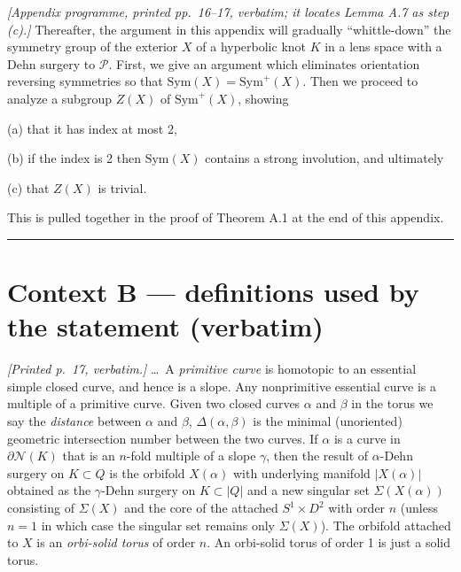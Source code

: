 \documentclass[11pt]{article}
\newcommand{\Sym}{\ensuremath{\mathrm{Sym}}}
\newcommand{\Ps}{\ensuremath{\mathcal{P}}}   %
\newcommand{\Ns}{\ensuremath{\mathcal{N}}}   %
\begin{document}
\medskip
\noindent\textit{[Appendix programme, printed pp.~16--17, verbatim; it locates Lemma A.7 as step
(c).]} Thereafter, the argument in this appendix will gradually ``whittle-down'' the symmetry group
of the exterior $X$ of a hyperbolic knot $K$ in a lens space with a Dehn surgery to $\Ps$. First,
we give an argument which eliminates orientation reversing symmetries so that
$\Sym(X) = \Sym^+(X)$. Then we proceed to analyze a subgroup $Z(X)$ of $\Sym^+(X)$, showing

(a) that it has index at most 2,

(b) if the index is 2 then $\Sym(X)$ contains a strong involution, and ultimately

(c) that $Z(X)$ is trivial.

This is pulled together in the proof of Theorem A.1 at the end of this appendix.

\bigskip
\hrule
\bigskip

\section*{Context B --- definitions used by the statement (verbatim)}


\noindent\textit{[Printed p.~17, verbatim.]} \dots\ A \emph{primitive curve}
is homotopic to an essential simple closed curve, and hence is a slope. Any nonprimitive essential
curve is a multiple of a primitive curve. Given two closed curves $\alpha$ and $\beta$ in the torus
we say the \emph{distance} between $\alpha$ and $\beta$, $\Delta(\alpha,\beta)$ is the minimal
(unoriented) geometric intersection number between the two curves. If $\alpha$ is a curve in
$\partial\Ns(K)$ that is an $n$-fold multiple of a slope $\gamma$, then the result of $\alpha$-Dehn
surgery on $K \subset Q$ is the orbifold $X(\alpha)$ with underlying manifold $|X(\alpha)|$
obtained as the $\gamma$-Dehn surgery on $K \subset |Q|$ and a new singular set $\Sigma(X(\alpha))$
consisting of $\Sigma(X)$ and the core of the attached $S^1\times D^2$ with order $n$ (unless
$n = 1$ in which case the singular set remains only $\Sigma(X)$). The orbifold attached to $X$ is an
\emph{orbi-solid torus} of order $n$. An orbi-solid torus of order 1 is just a solid torus.
\end{document}
